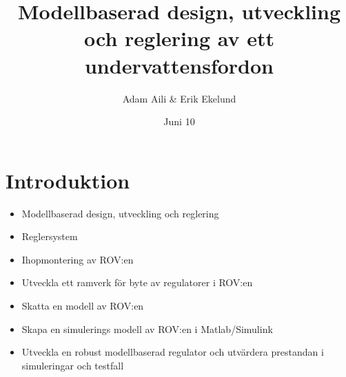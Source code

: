 \documentclass[11pt,aspectratio=169]{beamer}
\author{Adam Aili \& Erik Ekelund}
\title{Modellbaserad design, utveckling och reglering av ett undervattensfordon}
\date{Juni 10}
\begin{document}
\begin{frame}
\titlepage
\end{frame}
\section{Introduktion}
\begin{frame}
\begin{itemize}
\item Modellbaserad design, utveckling och reglering
\item Reglersystem
\end{itemize}
\end{frame}

\begin{frame}
\begin{itemize}
\item Ihopmontering av ROV:en
\item Utveckla ett ramverk för byte av regulatorer i ROV:en
\item Skatta en modell av ROV:en
\item Skapa en simulerings modell av ROV:en i Matlab/Simulink
\item Utveckla en robust modellbaserad regulator och utvärdera prestandan i simuleringar och testfall
\end{itemize}
\end{frame}


\end{document}
